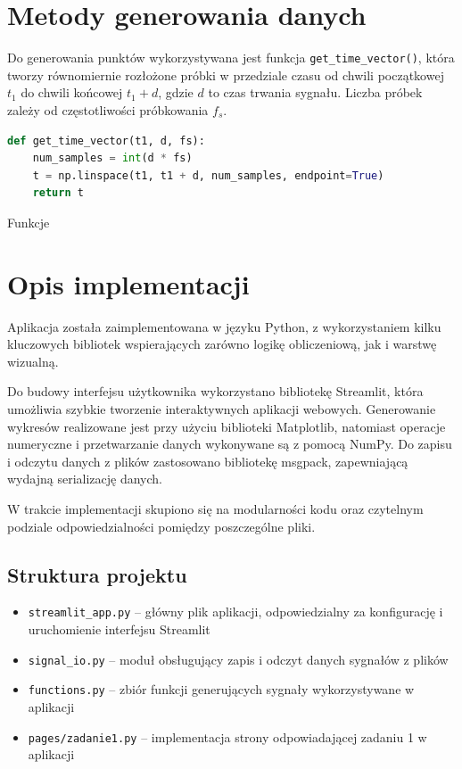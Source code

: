 \documentclass[12pt]{article}
\begin{document}
\section{Metody generowania danych}

Do generowania punktów wykorzystywana jest funkcja \texttt{get\_time\_vector()}, która tworzy równomiernie rozłożone próbki w przedziale czasu od chwili początkowej \(t_1\) do chwili końcowej \(t_1 + d\), gdzie \(d\) to czas trwania sygnału. Liczba próbek zależy od częstotliwości próbkowania \(f_s\).
\begin{lstlisting}[language=python]
def get_time_vector(t1, d, fs):
	num_samples = int(d * fs)
	t = np.linspace(t1, t1 + d, num_samples, endpoint=True)
	return t
\end{lstlisting}

\noindent
Funkcje \cite{cps-zadanie1-instrukcja}


\section{Opis implementacji}

Aplikacja została zaimplementowana w języku Python, z wykorzystaniem kilku kluczowych bibliotek wspierających zarówno logikę obliczeniową, jak i warstwę wizualną.

Do budowy interfejsu użytkownika wykorzystano bibliotekę Streamlit, która umożliwia szybkie tworzenie interaktywnych aplikacji webowych. Generowanie wykresów realizowane jest przy użyciu biblioteki Matplotlib, natomiast operacje numeryczne i przetwarzanie danych wykonywane są z pomocą NumPy. Do zapisu i odczytu danych z plików zastosowano bibliotekę msgpack, zapewniającą wydajną serializację danych.

W trakcie implementacji skupiono się na modularności kodu oraz czytelnym podziale odpowiedzialności pomiędzy poszczególne pliki.

\subsection*{Struktura projektu}

\begin{itemize}
	\item \texttt{streamlit\_app.py} -- główny plik aplikacji, odpowiedzialny za konfigurację i uruchomienie interfejsu Streamlit
	\item \texttt{signal\_io.py} -- moduł obsługujący zapis i odczyt danych sygnałów z plików
	\item \texttt{functions.py} -- zbiór funkcji generujących sygnały wykorzystywane w aplikacji
	\item \texttt{pages/zadanie1.py} -- implementacja strony odpowiadającej zadaniu 1 w aplikacji
\end{itemize}
\end{document}
